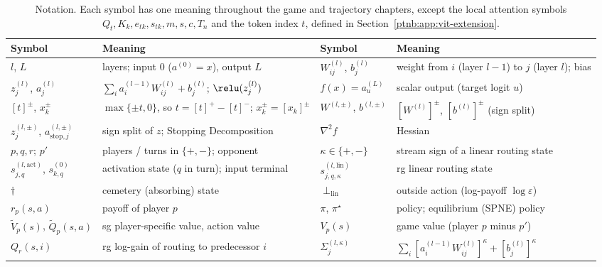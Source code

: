 \begin{table}[H]
    \centering
    \footnotesize
    \caption{Notation. Each symbol has one meaning throughout the game and trajectory chapters, except the local
    attention symbols $Q_t, K_k, e_{tk}, s_{tk}, m, s, c, T_n$ and the token index $t$, defined in
    Section~\ref{ptnb:app:vit-extension}.}\label{ptnb:tab:notation}
    \setlength{\tabcolsep}{4pt}
    \renewcommand{\arraystretch}{1.12}
    \begin{tabularx}{\textwidth}{@{}l X l X@{}}
        \toprule
        \textbf{Symbol} & \textbf{Meaning} & \textbf{Symbol} & \textbf{Meaning} \\
        \midrule
        $l$, $L$ & layers; input $0$ ($a^{(0)} = x$), output $L$ & $W^{(l)}_{ij}$, $b^{(l)}_j$ & weight
        from $i$ (layer $l{-}1$) to $j$ (layer $l$); bias \\
        $z^{(l)}_j$, $a^{(l)}_j$ & $\sum_i a^{(l-1)}_i W^{(l)}_{ij} + b^{(l)}_j$; $\relu(z^{(l)}_j)$ &
        $f(x) = a^{(L)}_u$ & scalar output (target logit $u$) \\
        $[t]^\pm$, $x_k^\pm$ & $\max\{\pm t, 0\}$, so $t = [t]^+ - [t]^-$; $x_k^\pm = [x_k]^\pm$ &
        $W^{(l,\pm)}$, $b^{(l,\pm)}$ & $[W^{(l)}]^\pm$, $[b^{(l)}]^\pm$ (sign split) \\
        $z^{(l,\pm)}_j$, $a^{(l,\pm)}_{\mathrm{stop},j}$ & sign split of $z$; Stopping Decomposition &
        $\nabla^2 f$ & Hessian \\
        \midrule
        $p, q, r$; $p'$ & players / turns in $\{+,-\}$; opponent & $\kappa \in \{+,-\}$ & stream sign of a
        linear routing state \\
        $s^{(l,\mathrm{act})}_{j,q}$, $s^{(0)}_{k,q}$ & activation state ($q$ in turn); input terminal &
        $s^{(l,\mathrm{lin})}_{j,q,\kappa}$ & \ac{rg} linear routing state \\
        $\dagger$ & cemetery (absorbing) state & $\perp_{\mathrm{lin}}$ & outside action (log-payoff
        $\log\varepsilon$) \\
        $r_p(s,a)$ & payoff of player $p$ & $\pi$, $\pi^\star$ & policy; equilibrium (SPNE) policy \\
        $\tilde V_p(s)$, $\tilde Q_p(s,a)$ & \ac{sg} player-specific value, action value & $V_p(s)$ & game
        value (player $p$ minus $p'$) \\
        $Q_r(s,i)$ & \ac{rg} log-gain of routing to predecessor $i$ & $\Sigma^{(l,\kappa)}_j$ & $\sum_i
            [a^{(l-1)}_i W^{(l)}_{ij}]^\kappa + [b^{(l)}_j]^\kappa$ \\

\end{tabularx}
\end{table}
